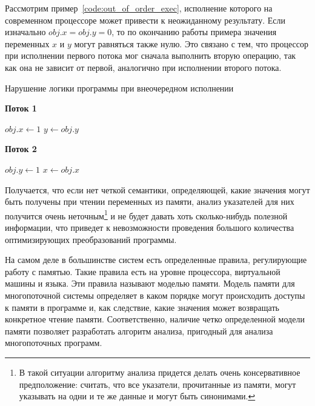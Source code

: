 \documentclass[14pt,titlepage,draft]{extarticle}
\newcommand{\algorithmictitle}[1]{\hspace{8mm}\textbf{#1}}
\begin{document}
    Рассмотрим пример~\ref{code:out_of_order_exec}, исполнение которого на
    современном процессоре может привести к неожиданному результату.
    Если изначально $obj.x = obj.y = 0$, то по окончанию работы примера
    значения переменных $x$ и $y$ могут равняться также нулю. Это связано с
    тем, что процессор при исполнении первого потока мог сначала выполнить
    вторую операцию, так как она не зависит от первой, аналогично при
    исполнении второго потока.

    \begin{algorithm}
      \caption{Нарушение логики программы при внеочередном исполнении}
      \label{code:out_of_order_exec}
      \begin{multicols}{2}
        \algorithmictitle{Поток 1}
        \begin{algorithmic}[1]
          \State $obj.x \gets 1$
          \State $y \gets obj.y$
        \end{algorithmic}
        \columnbreak
        \algorithmictitle{Поток 2}
        \begin{algorithmic}[1]
          \State $obj.y \gets 1$
          \State $x \gets obj.x$
        \end{algorithmic}
      \end{multicols}
    \end{algorithm}

    Получается, что если нет четкой семантики, определяющей, какие значения
    могут быть получены при чтении переменных из памяти, анализ указателей
    для них получится очень неточным\footnote{
      В такой ситуации алгоритму анализа придется делать очень консервативное
      предположение: считать, что все указатели, прочитанные из памяти, могут
      указывать на одни и те же данные и могут быть синонимами.
    } и не будет давать хоть сколько-нибудь полезной информации, что приведет
    к невозможности проведения большого количества оптимизирующих
    преобразований программы.

    На самом деле в большинстве систем есть определенные правила,
    регулирующие работу с памятью. Такие правила есть на уровне процессора,
    виртуальной машины и языка. Эти правила называют моделью памяти.
    Модель памяти для многопоточной системы определяет в каком
    порядке могут происходить доступы к памяти в программе и, как следствие,
    какие значения может возвращать конкретное чтение памяти. Соответственно,
    наличие четко определенной модели памяти позволяет разработать алгоритм
    анализа, пригодный для анализа многопоточных программ.
\end{document}
